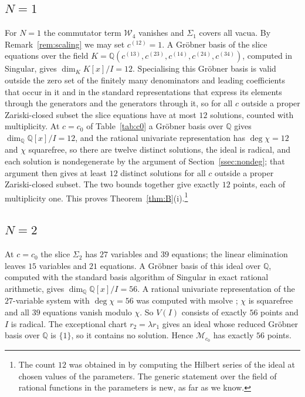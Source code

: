\documentclass[11pt]{amsart}
\theoremstyle{definition}
\newcommand{\QQ}{\mathbb{Q}}
\newcommand{\cM}{\mathcal M}
\newcommand{\cW}{\mathcal W}
\begin{document}
\subsection{\texorpdfstring{$N=1$}{N=1}}
For $N=1$ the commutator term $\cW_4$ vanishes and $\Sigma_1$ covers all vacua. By Remark~\ref{rem:scaling} we may set $c^{(12)}=1$. A Gröbner basis of the slice equations over the field $K=\QQ(c^{(13)},c^{(23)},c^{(14)},c^{(24)},c^{(34)})$, computed in Singular, gives $\dim_KK[x]/I=12$. Specialising this Gröbner basis is valid outside the zero set of the finitely many denominators and leading coefficients that occur in it and in the standard representations that express its elements through the generators and the generators through it, so for all $c$ outside a proper Zariski-closed subset the slice equations have at most $12$ solutions, counted with multiplicity. At $c=c_0$ of Table~\ref{tab:c0} a Gröbner basis over $\QQ$ gives $\dim_\QQ\QQ[x]/I=12$, and the rational univariate representation has $\deg\chi=12$ and $\chi$ squarefree, so there are twelve distinct solutions, the ideal is radical, and each solution is nondegenerate by the argument of Section~\ref{ssec:nondeg}; that argument then gives at least $12$ distinct solutions for all $c$ outside a proper Zariski-closed subset. The two bounds together give exactly $12$ points, each of multiplicity one. This proves Theorem~\ref{thm:B}(i).\footnote{The count $12$ was obtained in \cite{CGMS14} by computing the Hilbert series of the ideal at chosen values of the parameters. The generic statement over the field of rational functions in the parameters is new, as far as we know.}

\subsection{\texorpdfstring{$N=2$}{N=2}}
At $c=c_0$ the slice $\Sigma_2$ has $27$ variables and $39$ equations; the linear elimination leaves $15$ variables and $21$ equations. A Gröbner basis of this ideal over $\QQ$, computed with the standard basis algorithm of Singular \cite{GP08} in exact rational arithmetic, gives $\dim_\QQ\QQ[x]/I=56$. A rational univariate representation of the $27$-variable system with $\deg\chi=56$ was computed with msolve \cite{BES21}; $\chi$ is squarefree and all $39$ equations vanish modulo $\chi$. So $V(I)$ consists of exactly $56$ points and $I$ is radical. The exceptional chart $r_2=\lambda r_1$ gives an ideal whose reduced Gröbner basis over $\QQ$ is $\{1\}$, so it contains no solution. Hence $\cM_{c_0}$ has exactly $56$ points.
\end{document}

